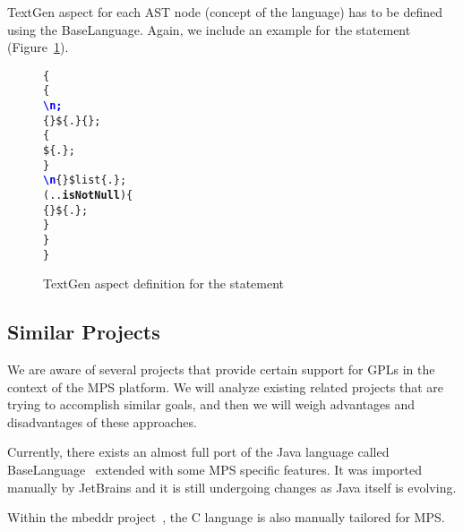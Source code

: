 TextGen aspect for each AST node (concept of the language) has to be defined using the BaseLanguage.
Again, we include an example for the  statement (Figure~\ref{fig:if_statement_textgen}).

\begin{figure}[ht]
\centering
\begin{alltt}
\small
{}  \{
   \{
     \textcolor{Blue}{\textbf{\textbackslash{}n;}}
     \{\} \$\{.\} \{\mpstgliteral{) \{}\};
     \{
       \$\{.\};
    \}
     \textcolor{Blue}{\textbf{\textbackslash{}n}} \{\mpstgliteral{\}}\} \$list\{.\};
     (..\textbf{isNotNull}) \{
       \{ \} \$\{.\};
    \}
  \}
\}
\end{alltt}
\caption{TextGen aspect definition for the  statement}
\label{fig:if_statement_textgen}
\end{figure}








\subsection{Similar Projects}

We are aware of several projects that provide certain support for GPLs in the context of the MPS platform.
We will analyze existing related projects that are trying to accomplish similar goals, and then we will weigh advantages and disadvantages of these approaches.

Currently, there exists an almost full port of the Java language called BaseLanguage~\cite{ref:BaseLanguage} extended with some MPS specific features.
It was imported manually by JetBrains and it is still undergoing changes as Java itself is evolving.

Within the mbeddr project~\cite{ref:mbeddr}, the C language is also manually tailored for MPS.


